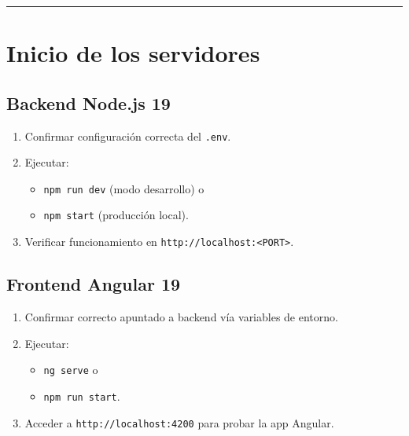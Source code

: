 \documentclass[
  spanish,
  11pt,
]{report}
\providecommand{\tightlist}{%
  \setlength{\itemsep}{0pt}\setlength{\parskip}{0pt}}
\begin{document}
\begin{center}\rule{0.5\linewidth}{0.5pt}\end{center}

\section{Inicio de los servidores}\label{inicio-de-los-servidores}

\subsection{Backend Node.js 19}\label{backend-node.js-19-1}

\begin{enumerate}
\def\labelenumi{\arabic{enumi}.}
\tightlist
\item
  Confirmar configuración correcta del \texttt{.env}.
\item
  Ejecutar:

  \begin{itemize}
  \tightlist
  \item
    \texttt{npm\ run\ dev} (modo desarrollo) o
  \item
    \texttt{npm\ start} (producción local).
  \end{itemize}
\item
  Verificar funcionamiento en
  \texttt{http://localhost:\textless{}PORT\textgreater{}}.
\end{enumerate}

\subsection{Frontend Angular 19}\label{frontend-angular-19-2}

\begin{enumerate}
\def\labelenumi{\arabic{enumi}.}
\tightlist
\item
  Confirmar correcto apuntado a backend vía variables de entorno.
\item
  Ejecutar:

  \begin{itemize}
  \tightlist
  \item
    \texttt{ng\ serve} o
  \item
    \texttt{npm\ run\ start}.
  \end{itemize}
\item
  Acceder a \texttt{http://localhost:4200} para probar la app Angular.
\end{enumerate}
\end{document}
